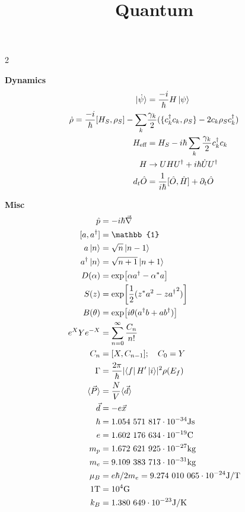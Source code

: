 \documentclass[12pt]{article}
\title{Quantum}
\date{}
\begin{document}
\maketitle

\begin{multicols}{2}

\textbf{Dynamics}
\begin{align}
  \ket*{\dot{\psi}} &= \frac{-i}{\hbar} H \ket{\psi}\\
  \dot{\rho} = \frac{-i}{\hbar} [H_S, \rho_S] - \sum_k &\frac{\gamma_k}{2} (\{c_k^{\dagger} c_k, \rho_S\} - 2 c_k \rho_S c_k^{\dagger})\\
  H_{\textrm{eff}} &= H_{S} - i \hbar \sum_k \frac{\gamma_k}{2} c_k^{\dagger} c_k\\
  H &\rightarrow UHU^{\dagger} + i \hbar\dot{U}U^{\dagger}\\
  d_t \hat{O} &= \frac{1}{i\hbar} [\hat{O}, \hat{H}] + \partial_t \hat{O}
\end{align}

\textbf{Misc}
\begin{align}
  \hat{p} &= -i\hbar\vec{\nabla}\\
  [a, a^{\dagger}] &= \mathbb{1}\\
  a \ket{n} &= \sqrt{n} \ket{n - 1}\\
  a^{\dagger} \ket{n} &= \sqrt{n + 1}\ket{n + 1}\\
  D(\alpha) &= \exp[\alpha a^{\dagger} - \alpha^{*} a]\\
  S(z) &= \exp[\frac{1}{2}(z^* a^2 - z {a^{\dagger}}^2)]\\
  B(\theta) &= \exp[i\theta(a^{\dagger}b + ab^{\dagger})]\\
  e^{X} Y e^{-X} &= \sum_{n = 0}^{\infty} \frac{C_n}{n!}\\
  C_n &= [X, C_{n - 1}]; \quad C_0 = Y\\
  \Gamma &= \frac{2\pi}{\hbar} \lvert \bra{f} H^{\prime} \ket{i} \rvert^2 \rho(E_f)\\
  \langle \vec{P} \rangle &= \frac{N}{V}\langle \vec{d} \rangle\\
  \vec{d} &= -e \vec{x}\\
  \hbar &= 1.054 \ 571 \ 817 \cdot 10^{-34} \textrm{Js}\\
  e &= 1.602 \ 176 \ 634 \cdot 10^{-19} \textrm{C}\\
  m_p &= 1.672 \ 621 \ 925 \cdot 10^{-27} \textrm{kg}\\
  m_e &= 9.109 \ 383 \ 713 \cdot 10^{-31} \textrm{kg}\\
  \mu_B &= e\hbar / 2m_e = 9.274 \ 010 \ 065 \cdot 10^{-24} \textrm{J}/\textrm{T}\\
  1 \textrm{T} &= 10^4 \textrm{G}\\
  k_B &= 1.380 \ 649 \cdot 10^{-23} \textrm{J/K}
\end{align}


\end{multicols}
\end{document}
